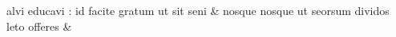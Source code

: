 \documentclass[12pt,onecolumn,twoside,a4paper]{memoir}
\begin{document}
\begin{pairs}
\begin{Leftside}
                              alvi
                              educavi
                              :
                              id
                              facite
                              gratum
                              ut
                              sit
                              seni \&
                         \stanza {}
                     nosque
                              {nosque}
                              ut
                              seorsum
                              dividos
                              leto
                              offeres \&
                     
                  \endnumbering
		\end{Leftside}
                  \begin{Rightside}
			\beginnumbering
			\numberstanzafalse
                     

\end{Rightside}
\end{pairs}
\end{document}
